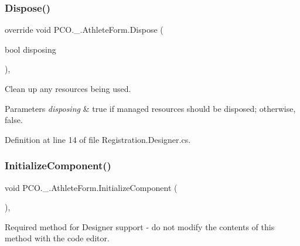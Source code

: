 \mbox{\label{classPCO_1_1__0_1_1AthleteForm_a28a1dc2c4ccd788db94afe809d281df3}} 
\subsubsection{\texorpdfstring{Dispose()}{Dispose()}}
{\footnotesize\ttfamily override void P\+C\+O.\+\_.\+Athlete\+Form.\+Dispose (\begin{DoxyParamCaption}\item[{bool}]{disposing }\end{DoxyParamCaption})\hspace{0.3cm}{\ttfamily [inline]}, {\ttfamily [protected]}}



Clean up any resources being used. 


\begin{DoxyParams}{Parameters}
{\em disposing} & true if managed resources should be disposed; otherwise, false.\\
\hline
\end{DoxyParams}


Definition at line 14 of file Registration.\+Designer.\+cs.

\mbox{\label{classPCO_1_1__0_1_1AthleteForm_aa5ce4e96e22a27bed4a483bb549c2619}} 
\subsubsection{\texorpdfstring{Initialize\+Component()}{InitializeComponent()}}
{\footnotesize\ttfamily void P\+C\+O.\+\_.\+Athlete\+Form.\+Initialize\+Component (\begin{DoxyParamCaption}{ }\end{DoxyParamCaption})\hspace{0.3cm}{\ttfamily [inline]}, {\ttfamily [private]}}



Required method for Designer support -\/ do not modify the contents of this method with the code editor. 



